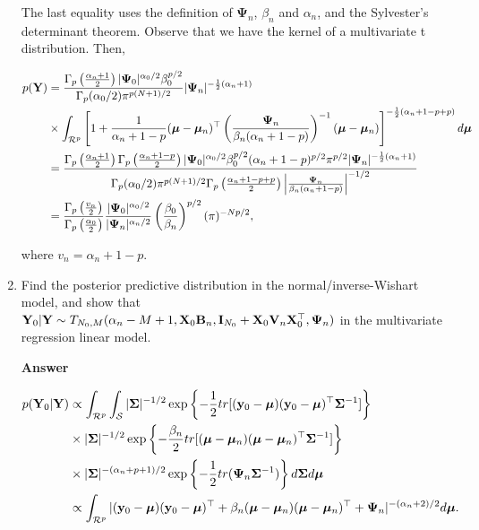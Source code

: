 \begin{enumerate}[leftmargin=*]
The last equality uses the definition of $\mathbf{\Psi}_n$, $\beta_n$ and $\alpha_n$, and the Sylvester's determinant theorem. Observe that we have the kernel of a multivariate t distribution. Then,

\begin{align*}
	p({\bf{Y}})	&=\frac{\Gamma_p\left(\frac{\alpha_n+1}{2}\right)|\mathbf{\Psi}_0|^{\alpha_0/2}\beta_0^{p/2}}{\Gamma_p(\alpha_0/2)\pi^{p(N+1)/2}}|\mathbf{\Psi}_n|^{-\frac{1}{2}(\alpha_n+1)}\\
	&\times\int_{\mathcal{R}^p} \left[ 1+\frac{1}{\alpha_n+1-p}(\bm{\mu}-\bm{\mu}_n)^{\top}\left(\frac{\mathbf{\Psi}_n}{\beta_n(\alpha_n+1-p)}\right)^{-1}(\bm{\mu}-\bm{\mu}_n)\right]^{-\frac{1}{2}(\alpha_n+1-p+p)} d\bm{\mu}\\
	&=\frac{\Gamma_p\left(\frac{\alpha_n+1}{2}\right)\Gamma_p\left(\frac{\alpha_n+1-p}{2}\right)|\mathbf{\Psi}_0|^{\alpha_0/2}\beta_0^{p/2}(\alpha_n+1-p)^{p/2}\pi^{p/2}|\mathbf{\Psi}_n|^{-\frac{1}{2}(\alpha_n+1)}}{\Gamma_p(\alpha_0/2)\pi^{p(N+1)/2}\Gamma_p\left(\frac{\alpha_n+1-p+p}{2}\right)\left|\frac{\mathbf{\Psi}_n}{\beta_n(\alpha_n+1-p)}\right|^{-1/2}}\\
	&=\frac{\Gamma_p\left(\frac{v_n}{2}\right)}{\Gamma_p\left(\frac{\alpha_0}{2}\right)}\frac{|\mathbf{\Psi}_0|^{\alpha_0/2}}{|\mathbf{\Psi}_n|^{\alpha_n/2}}\left(\frac{\beta_0}{\beta_n}\right)^{p/2}(\pi)^{-Np/2},
\end{align*}

where $v_n=\alpha_n+1-p$.


\item Find the posterior predictive distribution in the normal/inverse-Wishart model, and show that ${\bf{Y}}_0|{\bf{Y}}\sim T_{N_0,M}(\alpha_n-M+1,{\bf{X}}_0{\bf{B}}_n,{\bf{I}}_{N_0}+{\bf{X}}_0{\bf{V}}_n{\bf{X}}_0^{\top},{\bf{\Psi}}_n)$ in the multivariate regression linear model.

\textbf{Answer}

\begin{align*}
	p({\bf{Y}}_0|{\bf{Y}})&\propto\int_{\mathcal{R}^p}\int_{\mathcal{S}}|\mathbf{\Sigma}|^{-1/2}\exp\left\{-\frac{1}{2}tr[({\bf{y}}_0-\bm{\mu})({\bf{y}}_0-\bm{\mu})^{\top}\mathbf{\Sigma}^{-1}]\right\}\\
	&\times |\mathbf{\Sigma}|^{-1/2}\exp\left\{-\frac{\beta_n}{2}tr[(\bm{\mu}-\bm{\mu}_n)(\bm{\mu}-\bm{\mu}_n)^{\top}\mathbf{\Sigma}^{-1}]\right\}\\
	&\times |\mathbf{\Sigma}|^{-(\alpha_n+p+1)/2}\exp\left\{-\frac{1}{2}tr(\mathbf{\Psi}_n \mathbf{\Sigma}^{-1})\right\}d\mathbf{\Sigma} d\bm{\mu}\\
	&\propto\int_{\mathcal{R}^p}|({\bf{y}}_0-\bm{\mu})({\bf{y}}_0-\bm{\mu})^{\top}+\beta_n(\bm{\mu}-\bm{\mu}_n)(\bm{\mu}-\bm{\mu}_n)^{\top}+\mathbf{\Psi}_n|^{-(\alpha_n+2)/2}d\bm{\mu}.
\end{align*}


\end{enumerate}
